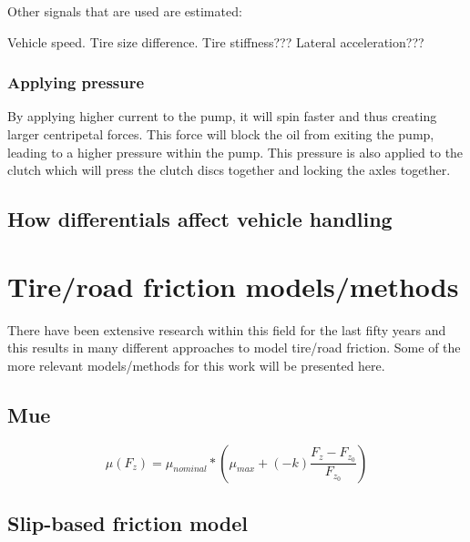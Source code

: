 Other signals that are used are estimated:

Vehicle speed.
Tire size difference.
Tire stiffness???
Lateral acceleration???



\subsubsection{Applying pressure}

By applying higher current to the pump, it will spin faster and thus creating larger centripetal forces. This force will block the oil from exiting the pump, leading to a higher pressure within the pump. This pressure is also applied to the clutch which will press the clutch discs together and locking the axles together.

\subsection{How differentials affect vehicle handling} 

\section{Tire/road friction models/methods}

There have been extensive research within this field for the last fifty years and this results in many different approaches to model tire/road friction. Some of the more relevant models/methods for this work will be presented here.

\subsection{Mue}

\begin{equation}
	\mu(F_{z})=\mu_{nominal}*(\mu_{max} + (-k)\frac{F_{z} - F_{z_{0}}}{F_{z_{0}}})
\end{equation}

\subsection{Slip-based friction model}
